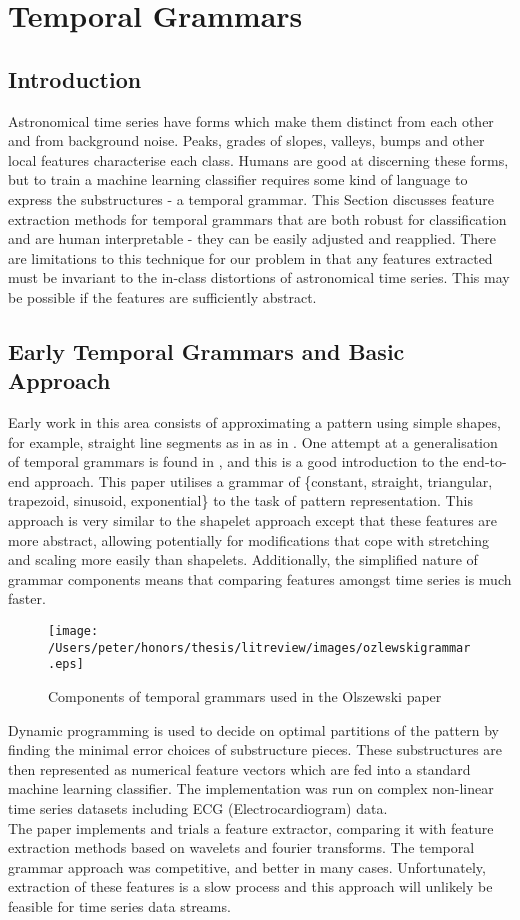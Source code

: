 	\section{Temporal Grammars}
	\subsection{Introduction}
	Astronomical time series have forms which make them distinct from each other and from background noise. Peaks, grades of slopes, valleys, bumps and other local features characterise each class. Humans are good at discerning these forms, but to train a machine learning classifier requires some kind of language to express the substructures - a temporal grammar. This Section discusses feature extraction methods for temporal grammars that are both robust for classification and are human interpretable - they can be easily adjusted and reapplied. There are limitations to this technique for our problem in that any features extracted must be invariant to the in-class distortions of astronomical time series. This may be possible if the features are sufficiently abstract.
	\subsection{Early Temporal Grammars and Basic Approach}
	Early work in this area consists of approximating a pattern using simple shapes, for example, straight line segments as in as in \citep{keogh1998enhanced}. One attempt at a generalisation of temporal grammars is found in \citep{olszewski2001generalized}, and this is a good introduction to the end-to-end approach. This paper utilises a grammar of \{constant, straight, triangular, trapezoid, sinusoid, exponential\} to the task of pattern representation. This approach is very similar to the shapelet approach except that these features are more abstract, allowing potentially for modifications that cope with stretching and scaling more easily than shapelets. Additionally, the simplified nature of grammar components means that comparing features amongst time series is much faster. 
	\begin{figure}[ht!]
	\centering
	\texttt{[image: /Users/peter/honors/thesis/litreview/images/ozlewskigrammar.eps]}
	\caption{Components of temporal grammars used in the Olszewski paper}
	\label{oslewskigrammar}
	\end{figure}
	Dynamic programming is used to decide on optimal partitions of the pattern by finding the minimal error choices of substructure pieces. These substructures are then represented as numerical feature vectors which are fed into a standard machine learning classifier. The implementation was run on complex non-linear time series datasets including ECG (Electrocardiogram) data. 
	\\
	The paper implements and trials a feature extractor, comparing it with feature extraction methods based on wavelets and fourier transforms. The temporal grammar approach was competitive, and better in many cases. Unfortunately, extraction of these features is a slow process and this approach will unlikely be feasible for time series data streams.
	
